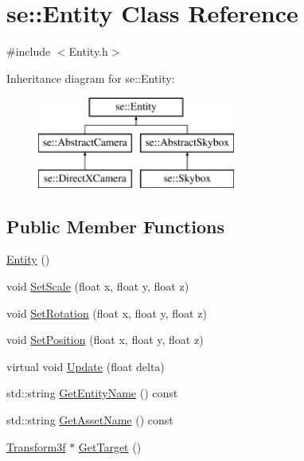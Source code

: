 \hypertarget{classse_1_1_entity}{}\section{se\+:\+:Entity Class Reference}
\label{classse_1_1_entity}


{\ttfamily \#include $<$Entity.\+h$>$}

Inheritance diagram for se\+:\+:Entity\+:\begin{figure}[H]
\begin{center}
\leavevmode
\includegraphics[height=3.000000cm]{classse_1_1_entity}
\end{center}
\end{figure}
\subsection*{Public Member Functions}
\begin{DoxyCompactItemize}
\item 
\mbox{\hyperlink{classse_1_1_entity_ac92492302d50c22ba7c4e9ff016b6145}{Entity}} ()
\item 
void \mbox{\hyperlink{classse_1_1_entity_a812b63adcbf5f1a3e429a31c6e0ff940}{Set\+Scale}} (float x, float y, float z)
\item 
void \mbox{\hyperlink{classse_1_1_entity_a41f820b99b2b6d76c97472dcddca7fa2}{Set\+Rotation}} (float x, float y, float z)
\item 
void \mbox{\hyperlink{classse_1_1_entity_a09e198e70620f231106d9f375f7598f3}{Set\+Position}} (float x, float y, float z)
\item 
virtual void \mbox{\hyperlink{classse_1_1_entity_a1cd277c4c5a517f5cde8b72d5c40a8f0}{Update}} (float delta)
\item 
std\+::string \mbox{\hyperlink{classse_1_1_entity_a2de55d070d6de1404c69e0da8b9d6d50}{Get\+Entity\+Name}} () const
\item 
std\+::string \mbox{\hyperlink{classse_1_1_entity_af1d512cba984ffe167decd7ecf7a88f4}{Get\+Asset\+Name}} () const
\item 
\mbox{\hyperlink{classse_1_1_transform3f}{Transform3f}} $\ast$ \mbox{\hyperlink{classse_1_1_entity_a677f32cd82e63f814b4be91518263242}{Get\+Target}} ()
\end{DoxyCompactItemize}
